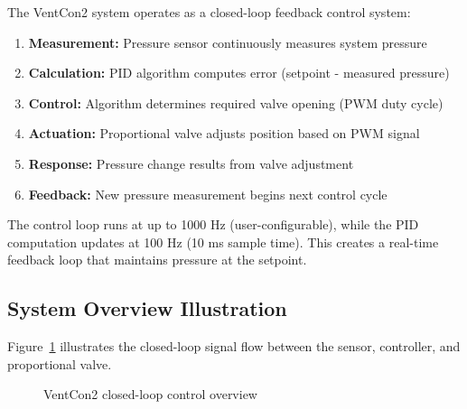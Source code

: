 The VentCon2 system operates as a closed-loop feedback control system:

    \begin{enumerate}
        \item \textbf{Measurement:} Pressure sensor continuously measures system pressure
        \item \textbf{Calculation:} PID algorithm computes error (setpoint - measured pressure)
        \item \textbf{Control:} Algorithm determines required valve opening (PWM duty cycle)
        \item \textbf{Actuation:} Proportional valve adjusts position based on PWM signal
        \item \textbf{Response:} Pressure change results from valve adjustment
        \item \textbf{Feedback:} New pressure measurement begins next control cycle
    \end{enumerate}

The control loop runs at up to 1000 Hz (user-configurable), while the PID computation updates at 100 Hz (10 ms sample time). This creates a real-time feedback loop that maintains pressure at the setpoint.

\subsection{System Overview Illustration}

Figure~\ref{fig:system-overall} illustrates the closed-loop signal flow between the sensor, controller, and proportional valve.

\begin{figure}[H]
\centering
{}
\caption{VentCon2 closed-loop control overview}
\label{fig:system-overall}
\end{figure}

